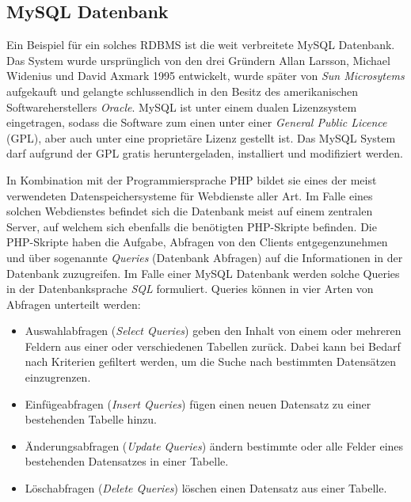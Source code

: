 \documentclass[a4paper,11pt]{report}
\begin{document}
				\subsection{MySQL Datenbank}
				Ein Beispiel für ein solches RDBMS ist die weit verbreitete MySQL Datenbank. Das System wurde ursprünglich von den drei Gründern Allan Larsson, Michael Widenius und David Axmark 1995 entwickelt, wurde später von \emph{Sun Microsytems} aufgekauft und gelangte schlussendlich in den Besitz des amerikanischen Softwareherstellers \emph{Oracle}. MySQL ist unter einem dualen Lizenzsystem eingetragen, sodass die Software zum einen unter einer \emph{General Public Licence} (GPL), aber auch unter eine proprietäre Lizenz gestellt ist. \cite{tecmint.com} Das MySQL System darf aufgrund der GPL gratis heruntergeladen, installiert und modifiziert werden.
				
				In Kombination mit der Programmiersprache PHP bildet sie eines der meist verwendeten Datenspeichersysteme für Webdienste aller Art. Im Falle eines solchen Webdienstes befindet sich die Datenbank meist auf einem zentralen Server, auf welchem sich ebenfalls die benötigten PHP-Skripte befinden. Die PHP-Skripte haben die Aufgabe, Abfragen von den Clients entgegenzunehmen und über sogenannte \emph{Queries} (Datenbank Abfragen) auf die Informationen in der Datenbank zuzugreifen. Im Falle einer MySQL Datenbank werden solche Queries in der Datenbanksprache \emph{SQL} formuliert. Queries können in vier Arten von Abfragen unterteilt werden: \cite[S. 760]{IT-Handbuch}
				
				\begin{itemize}
					\item Auswahlabfragen (\emph{Select Queries}) geben den Inhalt von einem oder mehreren Feldern aus einer oder verschiedenen Tabellen zurück. Dabei kann bei Bedarf nach Kriterien gefiltert werden, um die Suche nach bestimmten Datensätzen einzugrenzen.\cite[S. 746]{IT-Handbuch}
					\item Einfügeabfragen (\emph{Insert Queries}) fügen einen neuen Datensatz zu einer bestehenden Tabelle hinzu.\cite[S. 746]{IT-Handbuch}
					\item Änderungsabfragen (\emph{Update Queries}) ändern bestimmte oder alle Felder eines bestehenden Datensatzes in einer Tabelle.\cite[S. 746]{IT-Handbuch}
					\item Löschabfragen (\emph{Delete Queries}) löschen einen Datensatz aus einer Tabelle. \cite[S. 746]{IT-Handbuch}
				\end{itemize}
				
\end{document}
